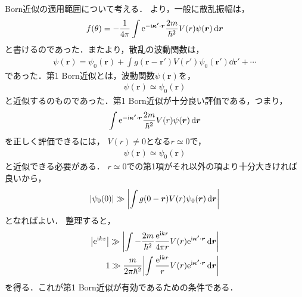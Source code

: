 \documentclass{report}
\begin{document}
  Born近似の適用範囲について考える．
  より，一般に散乱振幅は，
  \begin{align}
    f(\theta) = -\frac{1}{4\pi} \int \mathrm{e}^{-\mathrm{i}\bm{\kappa'}\cdot\bm{r}} \frac{2m}{\hbar^2}V(r)\psi(\bm{r})\dd{\bm{r}}
  \end{align}
  と書けるのであった．またより，散乱の波動関数は，
  \begin{align}
    \psi(\bm{r}) = \psi_0(\bm{r}) + \int g(\bm{r} - \bm{r'}) V(r') \psi_0(\bm{r'}) \dd{\bm{r'}} + \cdots \label{BornWF}
  \end{align}
  であった．第1 Born近似とは，波動関数$\psi(\bm{r})$を，
  \begin{align}
    \psi(\bm{r}) \simeq \psi_0(\bm{r})
  \end{align}
  と近似するのものであった．第1 Born近似が十分良い評価である，つまり，
  \begin{align}
    \int \mathrm{e}^{-\mathrm{i} \bm{\kappa'}\cdot \bm{r}} \frac{2m}{\hbar^2}V(r)\psi(\bm{r})\dd{\bm{r}}
  \end{align}
  を正しく評価できるには，
  $V(r) \neq 0$となる$r\simeq 0$で，
  \begin{align}
    \psi(\bm{r}) \simeq \psi_0(\bm{r})
  \end{align}
  と近似できる必要がある．
  $r \simeq 0$での第1項がそれ以外の項より十分大きければ良いから，
  \begin{align}
    \abs{\psi_0(0)} \gg \abs{\int g(0 - \bm{r}) V(r) \psi_0(\bm{r}) \dd{\bm{r}}}
  \end{align}
  となればよい．
  整理すると，
  \begin{align}
    \abs{\mathrm{e}^{\mathrm{i} kz}} \gg \abs{\int -\frac{2m}{\hbar^2}\frac{\mathrm{e}^{\mathrm{i} kr}}{4\pi r}V(r) \mathrm{e}^{\mathrm{i} \bm{\kappa'}\cdot\bm{r}}\dd{\bm{r}}} \\
    1 \gg \frac{m}{2\pi \hbar^2}\abs{\int \frac{\mathrm{e}^{\mathrm{i} kr}}{r}V(r)\mathrm{e}^{\mathrm{i}\bm{\kappa'}\cdot\bm{r}}\dd{\bm{r}}}\label{BornCondition}
  \end{align}
  を得る．これが第1 Born近似が有効であるための条件である．
\end{document}
